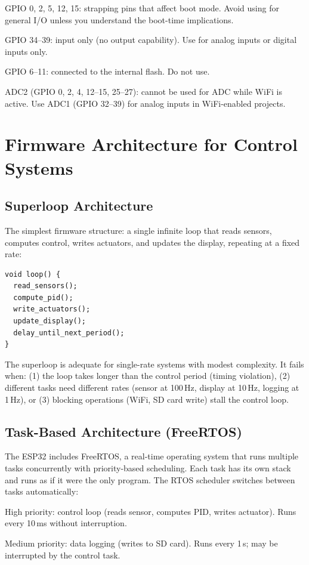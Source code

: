 GPIO 0, 2, 5, 12, 15: strapping pins that affect boot mode. Avoid using for general I/O unless you understand the boot-time implications.

GPIO 34--39: input only (no output capability). Use for analog inputs or digital inputs only.

GPIO 6--11: connected to the internal flash. Do not use.

ADC2 (GPIO 0, 2, 4, 12--15, 25--27): cannot be used for ADC while WiFi is active. Use ADC1 (GPIO 32--39) for analog inputs in WiFi-enabled projects.

\section{Firmware Architecture for Control Systems}
\subsection{Superloop Architecture}
The simplest firmware structure: a single infinite loop that reads sensors, computes control, writes actuators, and updates the display, repeating at a fixed rate:

\begin{verbatim}
void loop() {
  read_sensors();
  compute_pid();
  write_actuators();
  update_display();
  delay_until_next_period();
}
\end{verbatim}

The superloop is adequate for single-rate systems with modest complexity. It fails when: (1) the loop takes longer than the control period (timing violation), (2) different tasks need different rates (sensor at 100\,Hz, display at 10\,Hz, logging at 1\,Hz), or (3) blocking operations (WiFi, SD card write) stall the control loop.

\subsection{Task-Based Architecture (FreeRTOS)}
The ESP32 includes FreeRTOS, a real-time operating system that runs multiple tasks concurrently with priority-based scheduling. Each task has its own stack and runs as if it were the only program. The RTOS scheduler switches between tasks automatically:

High priority: control loop (reads sensor, computes PID, writes actuator). Runs every 10\,ms without interruption.

Medium priority: data logging (writes to SD card). Runs every 1\,s; may be interrupted by the control task.

